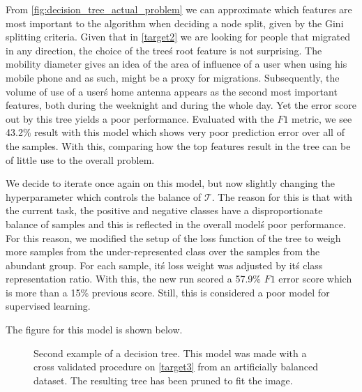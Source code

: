\smallskip


From \cref{fig:decision_tree_actual_problem} we can approximate which features are most important to the algorithm when deciding a node split, given by the Gini splitting criteria.
Given that in \cref{target2} we are looking for people that migrated in any direction, the choice of the tree\'s root feature is not surprising.
The mobility diameter gives an idea of the area of influence of a user when using his mobile phone and as such, might be a proxy for migrations.
Subsequently, the volume of use of a user\'s home antenna appears as the second most important features, both during the weeknight and during the whole day.
Yet the error score out by this tree yields a poor performance.
Evaluated with the $F1$ metric, we see 43.2\% result with this model which shows very poor prediction error over all of the samples.
With this, comparing how the top features result in the tree can be of little use to the overall problem.

We decide to iterate once again on this model, but now slightly changing the hyperparameter which controls the balance of $\mathcal{T}$.
The reason for this is that with the current task, the positive and negative classes have a disproportionate balance of samples and this is reflected in the overall model\'s poor performance.
For this reason, we modified the setup of the loss function of the tree to weigh more samples from the under-represented class over the samples from the abundant group.
For each sample, it\'s loss weight was adjusted by it\'s class representation ratio.
With this, the new run scored a 57.9\% $F1$ error score which is more than a 15\% previous score.
Still, this is considered a poor model for supervised learning.

The figure for this model is shown below.

\bigskip

\begin{figure}
	\centering
	\caption{ Second example of a decision tree.
		This model was made with a cross validated procedure on \cref{target3} from an artificially balanced dataset.
		The resulting tree has been pruned to fit the image.}
	\label{fig:decision_tree_actual_problem2}
\end{figure}


